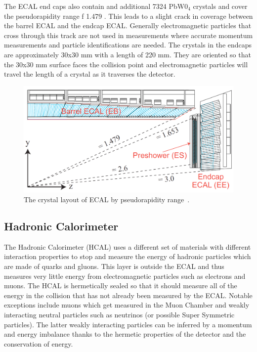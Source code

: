 	The ECAL end caps also contain and additional 7324 PbW0$_4$ crystals and cover the pseudorapidity range f 1.479 \lt \abseta {}. This leads to a slight crack in coverage between the barrel ECAL and the endcap ECAL. Generally electromagnetic particles that cross through this track are not used in measurements where accurate momentum measurements and particle identifications are needed. The crystals in the endcaps are approximately 30x30 mm with a length of 220 mm. They are oriented so that the 30x30 mm surface faces the collision point and electromagnetic particles will travel the length of a crystal as it traverses the detector.
	 
	 
						\begin{figure}[h]
\begin{center}
\includegraphics[width=0.8\linewidth]{Figs/ECAL_layout.png}
\caption{\label{fig:ecal}
The crystal layout of ECAL by pseudorapidity range~\cite{tdr1}.
}
\end{center}
\end{figure}
	
	\subsection{Hadronic Calorimeter}
	\label{sec:hadronic_calorimeter}
	The Hadronic Calorimeter (HCAL) uses a different set of materials with different interaction properties to stop and measure the energy of hadronic particles which are made of quarks and gluons. This layer is outside the ECAL and thus measures very little energy from electromagnetic particles such as electrons and muons. The HCAL is hermetically sealed so that it should measure all of the energy in the collision that has not already been measured by the ECAL. Notable exceptions include muons which get measured in the Muon Chamber and weakly interacting neutral particles such as neutrinos (or possible Super Symmetric particles). The latter weakly interacting particles can be inferred by a momentum and energy imbalance thanks to the hermetic properties of the detector and the conservation of energy.\\
	
